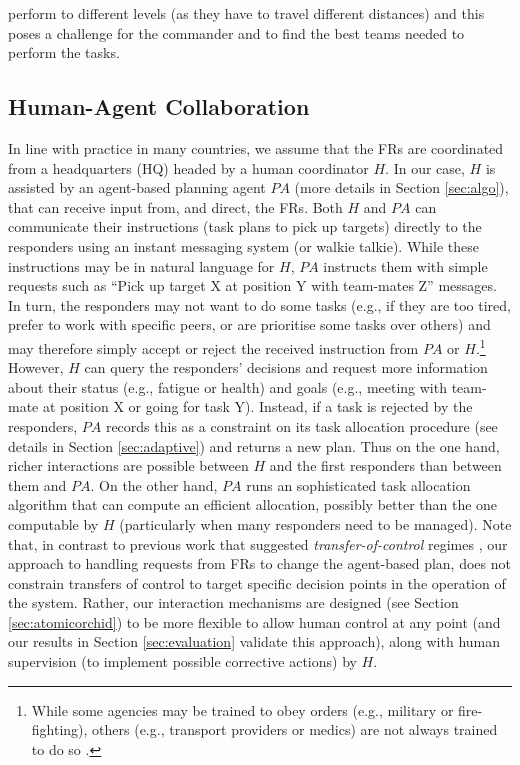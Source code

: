 perform to different levels (as they have to travel different distances) and this poses a challenge for the commander and to find the best teams needed to perform the tasks.
%
\subsection{Human-Agent Collaboration}
\noindent In line with practice in many countries, we assume that the FRs are coordinated from a headquarters (HQ) headed by a human coordinator $H$. In our case, $H$ is assisted by an agent-based planning agent $PA$ (more details in Section \ref{sec:algo}), that can receive input from, and direct, the FRs.   Both  $H$ and $PA$  can communicate their  instructions (task plans to pick up targets) directly to the responders using an instant messaging system (or walkie talkie).  While these instructions may be in natural language for $H$, $PA$ instructs them with simple requests such as ``Pick up target X at position Y with team-mates Z'' messages. In turn, the responders may not want to do some tasks (e.g., if they are too tired, prefer to work with specific  peers, or are prioritise some tasks over others) and may therefore simply accept or reject the received instruction from $PA$ or $H$.\footnote{While some agencies may be trained to obey orders (e.g., military or fire-fighting), others (e.g., transport providers or medics) are not  always trained to do so \cite{harvard2010disaster}.} However, $H$ can query the responders' decisions and request  more information about their status (e.g., fatigue or health) and goals (e.g., meeting with team-mate at position X or going for task Y). Instead, if a task is rejected by the responders, $PA$ records this as a constraint on its task allocation procedure (see details in Section \ref{sec:adaptive}) and returns a new plan. Thus on the one hand, richer interactions are possible between $H$ and the first responders than between them and $PA$. On the other hand, $PA$ runs an sophisticated task allocation algorithm that can compute an efficient allocation, possibly better than the one computable by $H$ (particularly when many responders need to be managed). Note that, in contrast to previous work that suggested \emph{transfer-of-control} regimes \cite{scerri:etal:2005}, our approach to handling requests from FRs to change the agent-based plan, does not constrain transfers of control to target specific decision points in the operation of the system. Rather, our interaction mechanisms are designed (see Section \ref{sec:atomicorchid}) to be more flexible to allow human control at any point (and our results  in Section \ref{sec:evaluation} validate this approach), along with human supervision (to implement possible corrective actions) by $H$.


